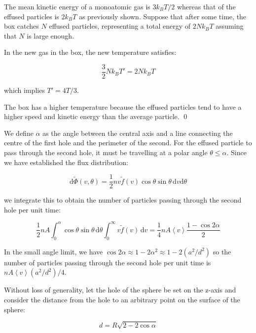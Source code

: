 \documentclass[12pt]{article}
\begin{document}
The mean kinetic energy of a monoatomic gas is $3k_{B}T/2$ whereas that of the effused particles is $2k_{B}T$ as previously shown. Suppose that after some time, the box catches $N$ effused particles, representing a total energy of $2Nk_{B}T$ assuming that $N$ is large enough.

In the new gas in the box, the new temperature satisfies:

\begin{equation}
    \frac{3}{2} Nk_{B}T' = 2Nk_{B}T
\end{equation}

which implies $T' = 4T/3$.

The box has a higher temperature because the effused particles tend to have a higher speed and kinetic energy than the average particle.
\qed



We define $\alpha$ as the angle between the central axis and a line connecting the centre of the first hole and the perimeter of the second. For the effused particle to pass through the second hole, it must be travelling at a polar angle $\theta \le \alpha$. Since we have established the flux distribution:

\begin{equation}
    \mathrm{d}\tilde{\Phi}(v, \theta) = \frac{1}{2} nv \tilde{f}(v) \cos{\theta} \sin{\theta} \, \mathrm{d}v \mathrm{d}\theta
\end{equation}

we integrate this to obtain the number of particles passing through the second hole per unit time:

\begin{equation}
    \frac{1}{2} nA \int_{0}^{\alpha} \cos{\theta} \sin{\theta} \, \mathrm{d}\theta \int_{0}^{\infty} v \tilde{f}(v) \, \mathrm{d}v = \frac{1}{4} nA \left\langle v \right\rangle \frac{1 - \cos{2\alpha}}{2}
\end{equation}

In the small angle limit, we have $\cos{2\alpha} \approx 1 - 2\alpha^{2} \approx 1 - 2(a^{2}/d^{2})$ so the number of particles passing through the second hole per unit time is $nA \left\langle v \right\rangle (a^{2}/d^{2})/4$.

Without loss of generality, let the hole of the sphere be set on the z-axis and consider the distance from the hole to an arbitrary point on the surface of the sphere:

\begin{equation}
    d = R \sqrt{2 - 2\cos{\alpha}}
\end{equation}
\end{document}
